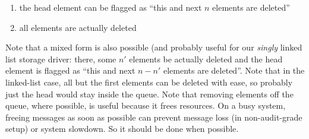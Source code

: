 \documentclass[a4paper,10pt]{article}
\begin{document}
\begin{enumerate}
\item the head element can be flagged as ``this and next $n$ elements are deleted''
\item all elements are actually deleted
\end{enumerate}

Note that a mixed form is also possible (and probably useful for our \emph{singly} linked list storage driver: there, some $n'$ elements be actually deleted and the head element is flagged as ``this and next $n - n'$ elements are deleted''. Note that in the linked-list case, all but the first elements can be deleted with ease, so probably just the head would stay inside the queue. Note that removing elements off the queue, where possible, is useful because it frees resources. On a busy system, freeing messages as soon as possible can prevent message loss (in non-audit-grade setup) or system slowdown. So it should be done when possible.
\end{document}
